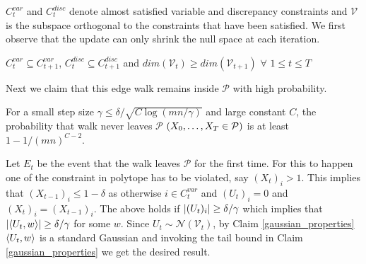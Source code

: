$C_t^{var}$ and $C_t^{disc}$ denote almost satisfied variable and discrepancy constraints and $\mathcal{V}$ is the subspace orthogonal to the constraints that have been satisfied.
We first observe that the update can only shrink the null space at each iteration.
\begin{Claim}
$C_t^{var} \subseteq C_{t+1}^{var}$, $C_t^{disc} \subseteq C_{t+1}^{disc}$ and $dim(\mathcal{V}_t) \geq dim(\mathcal{V}_{t+1})$ $\forall$ $1 \leq t \leq T$
\end{Claim}
Next we claim that this edge walk remains inside $\mathcal{P}$ with high probability.
\begin{Claim}
For a small step size $\gamma \leq \delta/\sqrt{C\log(mn/\gamma)}$ and large constant $C$, the probability that walk never leaves $\mathcal{P}$ $\left(X_0,\hdots,X_T \in \mathcal{P} \right )$ is at least $1 - 1/(mn)^{C-2}$.
\end{Claim}
Let $E_t$ be the event that the walk leaves $\mathcal{P}$ for the first time. 
For this to happen one of the constraint in polytope has to be violated, say $(X_t)_i>1$. 
This implies that $(X_{t-1})_i \leq 1 - \delta$ as otherwise $i \in C_t^{var}$ and $(U_t)_i=0$ and $(X_{t})_i=(X_{t-1})_i$. 
The above holds if $\left\lvert (U_t)_i \right\rvert \geq \delta/\gamma$ which implies that $\left\lvert \left\langle U_t,w\right\rangle \right\rvert \geq \delta/\gamma$ for some $w$.
Since $U_t \sim \mathcal{N}(\mathcal{V}_t)$, by Claim \ref{gaussian_properties} $\left\langle U_t,w\right\rangle$ is a standard Gaussian and invoking the tail bound in Claim \ref{gaussian_properties} we get the desired result.

